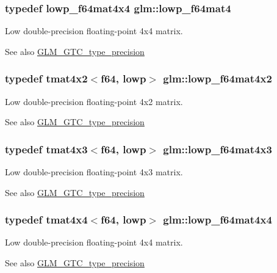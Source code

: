 \subsubsection[{lowp\+\_\+f64mat4}]{\setlength{\rightskip}{0pt plus 5cm}typedef {\bf lowp\+\_\+f64mat4x4} {\bf glm\+::lowp\+\_\+f64mat4}}\label{namespaceglm_a4378d9384f1b24848043ccb02dcf2959}
Low double-\/precision floating-\/point 4x4 matrix. \begin{DoxySeeAlso}{See also}
\hyperlink{group__gtc__type__precision}{G\+L\+M\+\_\+\+G\+T\+C\+\_\+type\+\_\+precision} 
\end{DoxySeeAlso}
\hypertarget{namespaceglm_a4909d8c3655c44e73c540c65ea476cea}{}
\subsubsection[{lowp\+\_\+f64mat4x2}]{\setlength{\rightskip}{0pt plus 5cm}typedef tmat4x2$<${\bf f64}, lowp$>$ {\bf glm\+::lowp\+\_\+f64mat4x2}}\label{namespaceglm_a4909d8c3655c44e73c540c65ea476cea}
Low double-\/precision floating-\/point 4x2 matrix. \begin{DoxySeeAlso}{See also}
\hyperlink{group__gtc__type__precision}{G\+L\+M\+\_\+\+G\+T\+C\+\_\+type\+\_\+precision} 
\end{DoxySeeAlso}
\hypertarget{namespaceglm_a100d1e29c0170af29dd678c0e0587934}{}
\subsubsection[{lowp\+\_\+f64mat4x3}]{\setlength{\rightskip}{0pt plus 5cm}typedef tmat4x3$<${\bf f64}, lowp$>$ {\bf glm\+::lowp\+\_\+f64mat4x3}}\label{namespaceglm_a100d1e29c0170af29dd678c0e0587934}
Low double-\/precision floating-\/point 4x3 matrix. \begin{DoxySeeAlso}{See also}
\hyperlink{group__gtc__type__precision}{G\+L\+M\+\_\+\+G\+T\+C\+\_\+type\+\_\+precision} 
\end{DoxySeeAlso}
\hypertarget{namespaceglm_a320b6621208d57155bc97ad404f3e584}{}
\subsubsection[{lowp\+\_\+f64mat4x4}]{\setlength{\rightskip}{0pt plus 5cm}typedef tmat4x4$<${\bf f64}, lowp$>$ {\bf glm\+::lowp\+\_\+f64mat4x4}}\label{namespaceglm_a320b6621208d57155bc97ad404f3e584}
Low double-\/precision floating-\/point 4x4 matrix. \begin{DoxySeeAlso}{See also}
\hyperlink{group__gtc__type__precision}{G\+L\+M\+\_\+\+G\+T\+C\+\_\+type\+\_\+precision} 
\end{DoxySeeAlso}
\hypertarget{namespaceglm_a0006c2206d9675a73e5e9e8fd29e1dc2}{}
